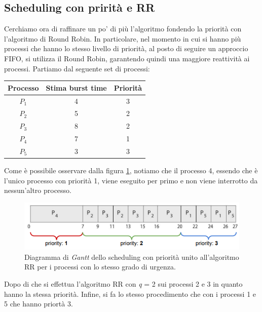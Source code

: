 \subsection{Scheduling con prirità e RR}
Cerchiamo ora di raffinare un po' di più l'algoritmo fondendo la priorità con l'algoritmo di Round Robin. In particolare, nel momento in cui si hanno più processi che hanno lo stesso livello di priorità, al posto di seguire un approccio FIFO, si utilizza il Round Robin, garantendo quindi una maggiore reattività ai processi. Partiamo dal seguente set di processi:
\begin{table}[h]
    \centering
    \begin{tabular}{c c c}
        \textbf{Processo} & \textbf{Stima burst time} & \textbf{Priorità} \\\hline
        $P_1$ & 4 & 3 \\
        $P_2$ & 5 & 2 \\
        $P_3$ & 8 & 2 \\
        $P_4$ & 7 & 1 \\
        $P_5$ & 3 & 3 \\\hline
    \end{tabular}
\end{table}

\noindent Come è possibile osservare dalla figura \ref{fig:priority_RR}, notiamo che il processo 4, essendo che è l'unico processo con priorità 1, viene eseguito per primo e non viene interrotto da nessun'altro processo.
\begin{figure}[h]
    \centering
    \includegraphics[width = .75\textwidth]{../res/imgs/CPU scheduling/priority_RR.png}
    \caption{Diagramma di \textit{Gantt} dello scheduling con priorità unito all'algoritmo RR per i processi con lo stesso grado di urgenza.}
    \label{fig:priority_RR}
\end{figure}
Dopo di che si effettua l'algoritmo RR con \textit{q} = 2 sui processi 2 e 3 in quanto hanno la stessa priorità. Infine, si fa lo stesso procedimento che con i processi 1 e 5 che hanno priortà 3. 

% 
